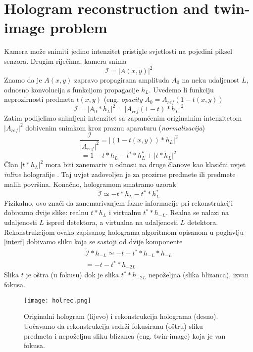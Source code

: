 \documentclass[hidelinks]{ferseminareng}
\begin{document}
	\section{Hologram reconstruction and twin-image problem}
	\label{reconstruction}
	Kamera može snimiti jedino intenzitet pristigle svjetlosti na pojedini piksel senzora. Drugim riječima, kamera snima
	\begin{equation}
	\mathcal{I}=|A(x,y)|^2
	\end{equation} 
	Znamo da je $A(x,y)$ zapravo propagirana amplituda $A_0$ na neku udaljenost $L$, odnosno konvolucija s funkcijom propagacije $h_L$. Uvedemo li funkciju neprozirnosti predmeta $t(x,y)$ (eng. \emph{opacity} $A_0 = A_{ref}(1 - t(x,y))$
	\begin{equation}
	\mathcal{I}=|A_0*h_L|^2
	=|A_{ref}(1-t)*h_L|^2
	\end{equation}
	Zatim podijelimo snimljeni intenzitet sa zapamćenim originalnim intenzitetom $|A_{ref}|^2$ dobivenim snimkom kroz praznu aparaturu (\emph{normalizacija})
	\begin{equation}
	\frac{\mathcal{I}}{|A_{ref}|^2}=|(1-t(x,y))*h_L|^2
	\end{equation}
	\begin{equation}
	=1-t*h_L-t^**h_L^*+|t*h_L|^2
	\end{equation}
	Član $|t*h_L|^2$ mora biti zanemariv u odnosu na druge članove kao klasični uvjet \emph{inline} holografije \cite{denis2005twin}. Taj uvjet zadovoljen je za prozirne predmete ili predmete malih površina. Konačno, hologramom smatramo uzorak
	\begin{equation}
	\mathcal{\tilde{I}}\simeq-t*h_L-t^**h_L^*
	\end{equation}
	Fizikalno, ovo znači da zanemarivanjem fazne informacije pri rekonstrukciji dobivamo dvije slike: realnu $t*h_L$ i virtualnu $t^**h_{-L}$. Realna se nalazi na udaljenosti $L$ ispred detektora, a virtualna na udaljenosti $L$ \grqq detektora.\\
	Rekonstrukcijom ovako zapisanog holograma algoritmom opisanom u poglavlju \ref{interf} dobivamo sliku koja se sastoji od dvije komponente
	\begin{gather}
		\mathcal{\tilde{I}}*h_{-L}\simeq-t-t^**h_{-L}*h_{-L}\\
		=-t-t^**h_{-2L}
	\end{gather}
	Slika $t$ je oštra (u fokusu) dok je slika $t^**h_{-2L}$ nepoželjna (slika blizanca), izvan fokusa.
	
	\begin{figure}[h]
		\texttt{[image: holrec.png]}
		\caption{Originalni hologram (lijevo) i rekonstrukcija holograma (desno). Uočavamo da rekonstrukcija sadrži fokusiranu (oštru) sliku predmeta i nepoželjnu sliku blizanca (eng. twin-image) koja je van fokusa.}
		\label{simulation}
	\end{figure}
	
\end{document}

